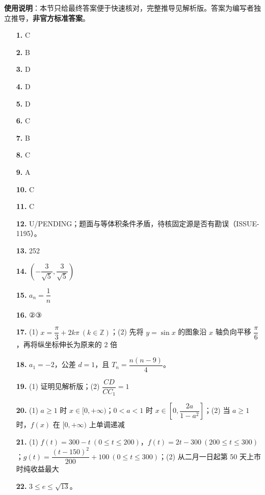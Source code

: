 
\begin{gknotice}
\textbf{使用说明}：本节只给最终答案便于快速核对，完整推导见解析版。答案为编写者独立推导，\textbf{非官方标准答案}。
\end{gknotice}

\begin{itemize}[leftmargin=2.6em]
  \item[\textbf{1.}] C
  \item[\textbf{2.}] B
  \item[\textbf{3.}] D
  \item[\textbf{4.}] D
  \item[\textbf{5.}] D
  \item[\textbf{6.}] C
  \item[\textbf{7.}] B
  \item[\textbf{8.}] C
  \item[\textbf{9.}] A
  \item[\textbf{10.}] C
  \item[\textbf{11.}] C
  \item[\textbf{12.}] U/PENDING；题面与等体积条件矛盾，待核固定源是否有勘误（ISSUE-1195）。
  \item[\textbf{13.}] 252
  \item[\textbf{14.}] $\left(-\dfrac3{\sqrt5},\dfrac3{\sqrt5}\right)$
  \item[\textbf{15.}] $a_n=\dfrac1n$
  \item[\textbf{16.}] ②③
  \item[\textbf{17.}] (1) $x=\dfrac\pi3+2k\pi\ (k\in\mathbb Z)$；(2) 先将 $y=\sin x$ 的图象沿 $x$ 轴负向平移 $\dfrac\pi6$，再将纵坐标伸长为原来的 2 倍
  \item[\textbf{18.}] $a_1=-2$，公差 $d=1$，且 $T_n=\dfrac{n(n-9)}4$。
  \item[\textbf{19.}] (1) 证明见解析版；(2) $\dfrac{CD}{CC_1}=1$
  \item[\textbf{20.}] (1) $a\ge1$ 时 $x\in[0,+\infty)$；$0<a<1$ 时 $x\in\left[0,\dfrac{2a}{1-a^2}\right]$；(2) 当 $a\ge1$ 时，$f(x)$ 在 $[0,+\infty)$ 上单调递减
  \item[\textbf{21.}] (1) $f(t)=300-t\ (0\le t\le200)$，$f(t)=2t-300\ (200\le t\le300)$；$g(t)=\dfrac{(t-150)^2}{200}+100\ (0\le t\le300)$；(2) 从二月一日起第 50 天上市时纯收益最大
  \item[\textbf{22.}] $3\le e\le\sqrt{13}$。
\end{itemize}
